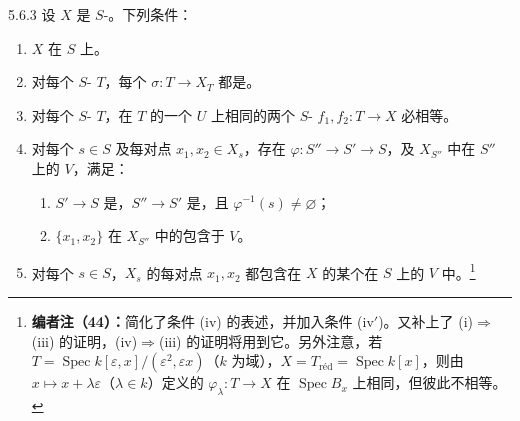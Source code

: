 \begin{SGAresult}{}{5.6.3}
设 $X$ 是 $S$-。下列条件：
\begin{enumerate}
\item[(i)] $X$ 在 $S$ 上。
\item[(ii)] 对每个 $S$- $T$，每个 $\sigma:T\to X_T$ 都是。
\item[(iii)] 对每个 $S$- $T$，在 $T$ 的一个 $U$ 上相同的两个 $S$- $f_1,f_2:T\to X$ 必相等。
\item[(iv)] 对每个 $s\in S$ 及每对点 $x_1,x_2\in X_s$，存在 $\varphi:S''\to S'\to S$，及 $X_{S''}$ 中在 $S''$ 上的 $V$，满足：
\begin{enumerate}
\item[a)] $S'\to S$ 是，$S''\to S'$ 是，且 $\varphi^{-1}(s)\ne\varnothing$；
\item[b)] $\{x_1,x_2\}$ 在 $X_{S''}$ 中的包含于 $V$。
\end{enumerate}
\item[(iv$'$)] 对每个 $s\in S$，$X_s$ 的每对点 $x_1,x_2$ 都包含在 $X$ 的某个在 $S$ 上的 $V$ 中。\footnote{\textbf{编者注（44）：}简化了条件 (iv) 的表述，并加入条件 (iv$'$)。又补上了 (i)$\Rightarrow$(iii) 的证明，(iv)$\Rightarrow$(iii) 的证明将用到它。另外注意，若 $T=\operatorname{Spec}k[\varepsilon,x]/(\varepsilon^2,\varepsilon x)$（$k$ 为域），$X=T_{\mathrm{r\text{é}d}}=\operatorname{Spec}k[x]$，则由 $x\mapsto x+\lambda\varepsilon$（$\lambda\in k$）定义的 $\varphi_\lambda:T\to X$ 在 $\operatorname{Spec}B_x$ 上相同，但彼此不相等。}
\end{enumerate}
\end{SGAresult}
